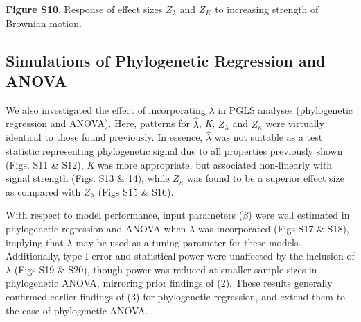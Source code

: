 \documentclass[
]{article}
\begin{document}
\textbf{Figure S10}. Response of effect sizes \(Z_{\lambda}\) and
\(Z_K\) to increasing strength of Brownian motion.

\newpage

\hypertarget{simulations-of-phylogenetic-regression-and-anova}{%
\subsection{Simulations of Phylogenetic Regression and
ANOVA}\label{simulations-of-phylogenetic-regression-and-anova}}

We also investigated the effect of incorporating \(\lambda\) in PGLS
analyses (phylogenetic regression and ANOVA). Here, patterns for
\(\hat\lambda\), \emph{K}, \(Z_\lambda\) and \(Z_\kappa\) were virtually
identical to those found previously. In essence, \(\hat\lambda\) was not
suitable as a test statistic representing phylogenetic signal due to all
properties previously shown (Figs. S11 \& S12), \emph{K} was more
appropriate, but associated non-linearly with signal strength (Figs. S13
\& 14), while \(Z_\kappa\) was found to be a superior effect size as
compared with \(Z_\lambda\) (Figs S15 \& S16). \hfill\break

With respect to model performance, input parameters (\(\beta\)) were
well estimated in phylogenetic regression and ANOVA when \(\lambda\) was
incorporated (Figs S17 \& S18), implying that \(\lambda\) may be used as
a tuning parameter for these models. Additionally, type I error and
statistical power were unaffected by the inclusion of \(\lambda\) (Figs
S19 \& S20), though power was reduced at smaller sample sizes in
phylogenetic ANOVA, mirroring prior findings of (2). These results
generally confirmed earlier findings of (3) for phylogenetic regression,
and extend them to the case of phylogenetic ANOVA.
\end{document}
